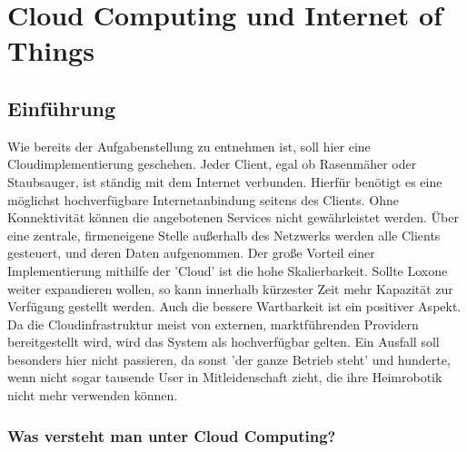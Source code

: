 \documentclass[letterpaper, 12pt]{article}
\let\tempsection\section
\renewcommand\section[1]{\vspace{-0.3cm}\tempsection{#1}\vspace{-0.3cm}}
\let\tempsubsection\subsection
\renewcommand\subsection[1]{\vspace{0cm}\tempsubsection{#1}\vspace{0cm}}
\let\tempsubsubsection\subsubsection
\renewcommand\subsubsection[1]{\vspace{0cm}\tempsubsubsection{#1}\vspace{0cm}}
\begin{document}
\clearpage

\section{Cloud Computing und Internet of Things}

\subsection{Einführung}

Wie bereits der Aufgabenstellung zu entnehmen ist, soll hier eine Cloudimplementierung geschehen. Jeder Client, egal ob Rasenmäher oder Staubsauger, ist ständig mit dem Internet verbunden. Hierfür benötigt es eine möglichst hochverfügbare Internetanbindung seitens des Clients. Ohne Konnektivität können die angebotenen Services nicht gewährleistet werden. Über eine zentrale, firmeneigene Stelle außerhalb des Netzwerks werden alle Clients gesteuert, und deren Daten aufgenommen. Der große Vorteil einer Implementierung mithilfe der 'Cloud' ist die hohe Skalierbarkeit. Sollte Loxone weiter expandieren wollen, so kann innerhalb kürzester Zeit mehr Kapazität zur Verfügung gestellt werden. Auch die bessere Wartbarkeit ist ein positiver Aspekt. Da die Cloudinfrastruktur meist von externen, marktführenden Providern bereitgestellt wird, wird das System als hochverfügbar gelten. Ein Ausfall soll besonders hier nicht passieren, da sonst 'der ganze Betrieb steht' und hunderte, wenn nicht sogar tausende User in Mitleidenschaft zieht, die ihre Heimrobotik nicht mehr verwenden können. \citep{ausarbeitungcc}

\subsubsection{Was versteht man unter Cloud Computing?}
\end{document}
